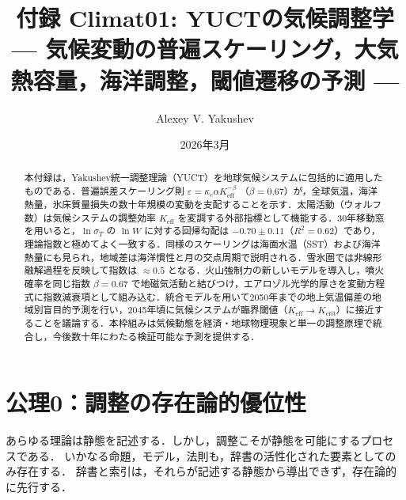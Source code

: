 \documentclass[11pt,a4paper]{article}
\begin{document}
	
	\title{付録 Climat01: YUCTの気候調整学\\
		\large --- 気候変動の普遍スケーリング，大気熱容量，海洋調整，閾値遷移の予測 ---}
	\author{Alexey V. Yakushev}
	\date{2026年3月}
	
	\maketitle
	
	\begin{abstract}
		\noindent
		本付録は，Yakushev統一調整理論（YUCT）を地球気候システムに包括的に適用したものである．普遍誤差スケーリング則 $\varepsilon = \kappa_c \alpha K_{\mathrm{eff}}^{-\beta}$ （$\beta = 0.67$）が，全球気温，海洋熱量，氷床質量損失の数十年規模の変動を支配することを示す．太陽活動（ウォルフ数）は気候システムの調整効率 $K_{\mathrm{eff}}$ を変調する外部指標として機能する．30年移動窓を用いると，$\ln \sigma_T$ の $\ln W$ に対する回帰勾配は $-0.70\pm0.11$（$R^2=0.62$）であり，理論指数と極めてよく一致する．同様のスケーリングは海面水温（SST）および海洋熱量にも見られ，地域差は海洋慣性と月の交点周期で説明される．雪氷圏では非線形融解過程を反映して指数は $\approx 0.5$ となる．火山強制力の新しいモデルを導入し，噴火確率を同じ指数 $\beta=0.67$ で地磁気活動と結びつけ，エアロゾル光学的厚さを変動方程式に指数減衰項として組み込む．統合モデルを用いて2050年までの地上気温偏差の地域別盲目的予測を行い，2045年頃に気候システムが臨界閾値（$K_{\mathrm{eff}} \to K_{\mathrm{crit}}$）に接近することを議論する．本枠組みは気候動態を経済・地球物理現象と単一の調整原理で統合し，今後数十年にわたる検証可能な予測を提供する．
	\end{abstract}
	
	\tableofcontents
	
	
	\section*{公理0：調整の存在論的優位性}
	
	あらゆる理論は静態を記述する．しかし，調整こそが静態を可能にするプロセスである．
	いかなる命題，モデル，法則も，辞書の活性化された要素としてのみ存在する．
	辞書と索引は，それらが記述する静態から導出できず，存在論的に先行する．
	
\end{document}
